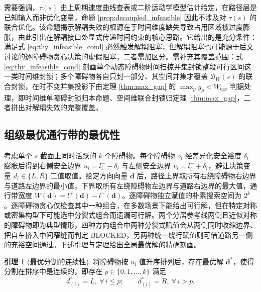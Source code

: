 \documentclass[a4paper,11pt]{ctexart}
\theoremstyle{definition}
\newtheorem{lemma}{引理}[section]
\begin{document}
需要强调，$\tau(s)$ 由上周期速度曲线查表或二阶运动学模型估计给定，在路径层是已知输入而非优化变量，命题 \ref{prop:decoupled_infeasible} 因此不涉及对 $\tau(s)$ 的联合优化。该命题揭示解耦失效的根源在于时间维度缺失导致占用区域被过度膨胀，由此引出在解耦接口处显式传递时间约束的核心思路。它给出的是充分条件：满足式 \eqref{eq:thy_infeasible_cond} 必然触发解耦阻塞，但解耦阻塞也可能源于后文讨论的逐障碍物贪心决策的虚假阻塞，二者需加区分。需补充其覆盖范围：式 \eqref{eq:thy_infeasible_cond} 刻画单个动态障碍物时间扫掠并集封锁整段可行区间这一类时间维封锁；多个障碍物各自只封一部分、其空间并集才覆盖 $\mathcal{B}_{W}(s)$ 的联合封锁，在时不变并集投影下由定理 \ref{thm:max_gap} 的 $\max_p g_p < W_{\text{ego}}$ 判据处理，即时间维单障碍封锁归本命题、空间维联合封锁归定理 \ref{thm:max_gap}，二者拼出对解耦失效的完整覆盖。

\subsection{组级最优通行带的最优性}
\label{sec:thy_max_gap}

考虑单个 $s$ 截面上同时活跃的 $k$ 个障碍物。每个障碍物 $o_i$ 经差异化安全裕度 $\delta_i$ 膨胀后得到右侧安全边界 $u_i = l_i^{-} - \delta_i$ 与左侧安全边界 $v_i = l_i^{+} + \delta_i$，避让决策变量 $d_i \in \{L, R\}$ 二值取值。给定方向向量 $\mathbf{d}$ 后，路径上界取所有右绕障碍物右边界与道路左边界的最小值，下界取所有左绕障碍物左边界与道路右边界的最大值，通行带宽度 $W(\mathbf{d}) = l^{+}(\mathbf{d}) - l^{-}(\mathbf{d})$。逐障碍物独立赋值的朴素搜索空间为 $2^k$。逐障碍物贪心仅检查其中一种组合，在多数场景下能给出可行解，但在特定对称或密集构型下可能选中分裂式组合而遗漏可行解。两个分居参考线两侧且近似对称的障碍物即为典型情形，四种方向组合中两种分裂式赋值会从两侧同时收缩边界、把自车挤入中间窄缝而判定 BLOCKED，另两种统一绕行赋值则可借道路另一侧的充裕空间通过。下述引理与定理给出全局最优解的精确刻画。

\begin{lemma}[最优分割的连续性]
\label{lem:continuous_partition}
将障碍物按 $u_i$ 值升序排列后，存在最优解 $\mathbf{d}^{*}$，使得分割在排序中是连续的，即存在 $p \in \{0, 1, \ldots, k\}$ 满足
\begin{equation}
    d_{(i)}^{*} = L,\ \forall\, i \leq p; \qquad d_{(i)}^{*} = R,\ \forall\, i > p.
    \label{eq:continuous_partition}
\end{equation}
\end{lemma}
\end{document}
